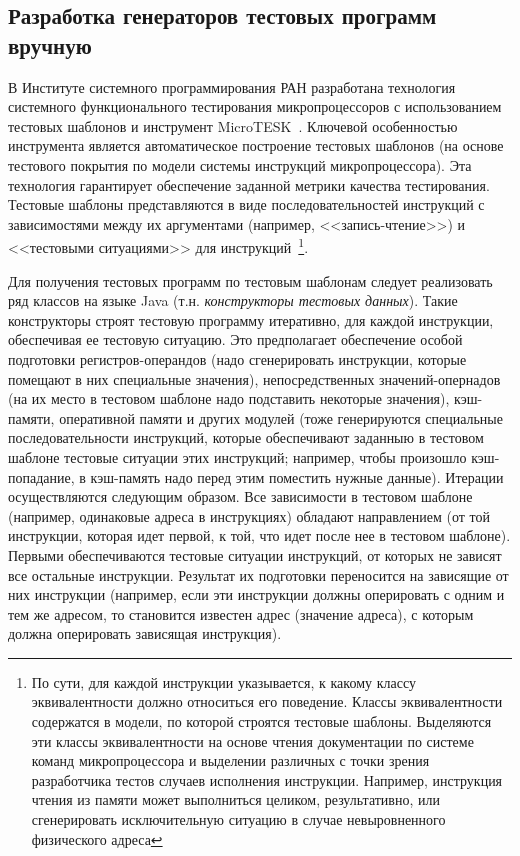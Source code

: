 \subsection{Разработка генераторов тестовых программ вручную}

В Институте системного программирования РАН разработана технология системного функционального
тестирования микропроцессоров с использованием тестовых шаблонов и инструмент MicroTESK~\cite{kamkin, vorobyev}. Ключевой особенностью инструмента является автоматическое построение тестовых шаблонов (на основе тестового покрытия по модели системы инструкций микропроцессора). Эта технология гарантирует обеспечение заданной метрики качества тестирования. Тестовые шаблоны представляются в виде последовательностей инструкций с
зависимостями между их аргументами (например, <<запись-чтение>>) и <<тестовыми ситуациями>> для инструкций~\footnote{По сути, для каждой инструкции указывается, к какому классу эквивалентности должно относиться его поведение. Классы эквивалентности содержатся в модели, по которой строятся тестовые шаблоны. Выделяются эти классы эквивалентности на основе чтения документации по системе команд микропроцессора и выделении различных с точки зрения разработчика тестов случаев исполнения инструкции. Например, инструкция чтения из памяти может выполниться целиком, результативно, или сгенерировать исключительную ситуацию в случае невыровненного физического адреса}.

Для получения тестовых программ по тестовым шаблонам следует реализовать ряд классов на языке Java (т.н. \emph{конструкторы тестовых данных}). Такие конструкторы строят тестовую программу итеративно, для каждой инструкции, обеспечивая ее тестовую ситуацию. Это предполагает обеспечение особой подготовки регистров-операндов (надо сгенерировать инструкции, которые помещают в них специальные значения), непосредственных значений-опернадов (на их место в тестовом шаблоне надо подставить некоторые значения), кэш-памяти, оперативной памяти и других модулей (тоже генерируются специальные последовательности инструкций, которые обеспечивают заданныю в тестовом шаблоне тестовые ситуации этих инструкций; например, чтобы произошло кэш-попадание, в кэш-память надо перед этим поместить нужные данные). Итерации осуществляются следующим образом. Все зависимости в тестовом шаблоне (например, одинаковые адреса в инструкциях) обладают направлением (от той инструкции, которая идет первой, к той, что идет после нее в тестовом шаблоне). Первыми обеспечиваются тестовые ситуации инструкций, от которых не зависят все остальные инструкции. Результат их подготовки переносится на зависящие от них инструкции (например, если эти инструкции должны оперировать с одним и тем же адресом, то становится известен адрес (значение адреса), с которым должна оперировать зависящая инструкция).

